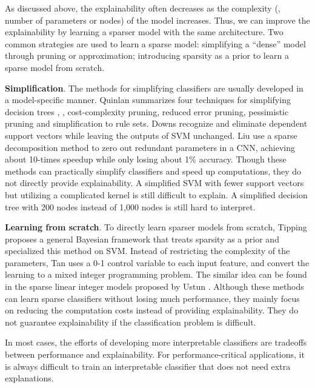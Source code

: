 As discussed above, the explainability often decreases as the complexity (\ie, number of parameters or nodes) of the model increases. Thus, we can improve the explainability by learning a sparser model with the same architecture. Two common strategies are used to learn a sparse model: simplifying a ``dense'' model through pruning or approximation; introducing sparsity as a prior to learn a sparse model from scratch. 


\textbf{Simplification}. The methods for simplifying classifiers are usually developed in a model-specific manner. Quinlan \cite{quinlan1987simplifying} summarizes four techniques for simplifying decision trees , \ie, cost-complexity pruning, reduced error pruning, pessimistic pruning and simplification to rule sets. Downs \etal \cite{downs2001simplifysvm} recognize and eliminate dependent support vectors while leaving the outputs of SVM unchanged. Liu \etal \cite{liu2015sparsecnn} use a sparse decomposition method to zero out redundant parameters in a CNN, achieving about 10-times speedup while only losing about 1\% accuracy. Though these methods can practically simplify classifiers and speed up computations, they do not directly provide explainability. A simplified SVM with fewer support vectors but utilizing a complicated kernel is still difficult to explain. A simplified decision tree with 200 nodes instead of 1,000 nodes is still hard to interpret.

\textbf{Learning from scratch}. To directly learn sparser models from scratch, Tipping \cite{tipping2001sparse} proposes a general Bayesian framework that treats sparsity as a prior and specialized this method on SVM. Instead of restricting the complexity of the parameters, Tan \etal \cite{tan2010sparsesvm} uses a 0-1 control variable to each input feature, and convert the learning to a mixed integer programming problem. The similar idea can be found in the sparse linear integer models proposed by Ustun \etal \cite{ustun2016supersparse}. Although these methods can learn sparse classifiers without losing much performance, they mainly focus on reducing the computation costs instead of providing explainability. They do not guarantee explainability if the classification problem is difficult.

In most cases, the efforts of developing more interpretable classifiers are tradeoffs between performance and explainability. For performance-critical applications, it is always difficult to train an interpretable classifier that does not need extra explanations.

